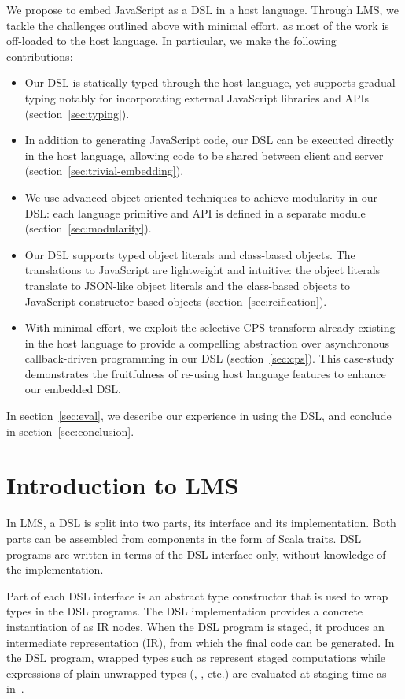 \documentclass[runningheads,a4paper]{llncs}
\begin{document}
We propose to embed JavaScript as a DSL in a host language. Through LMS, we tackle the challenges outlined above with minimal effort, as most of the work is off-loaded to the host language. In particular, we make the following contributions:
\begin{itemize}
\item Our DSL is statically typed through the host language, yet supports gradual typing notably for incorporating external JavaScript libraries and APIs (section~\ref{sec:typing}).
\item In addition to generating JavaScript code, our DSL can be executed directly in the host language, allowing code to be shared between client and server (section~\ref{sec:trivial-embedding}).
\item We use advanced object-oriented techniques to achieve modularity in our DSL: each language primitive and API is defined in a separate module (section~\ref{sec:modularity}).
\item Our DSL supports typed object literals and class-based objects. The translations to JavaScript are lightweight and intuitive: the object literals translate to JSON-like object literals and the class-based objects to JavaScript constructor-based objects (section~\ref{sec:reification}).
\item With minimal effort, we exploit the selective CPS transform already existing in the host language to provide a compelling abstraction over asynchronous callback-driven programming in our DSL (section~\ref{sec:cps}). This case-study demonstrates the fruitfulness of re-using host language features to enhance our embedded DSL.
\end{itemize}

In section~\ref{sec:eval}, we describe our experience in using the DSL, and conclude in section~\ref{sec:conclusion}.


\section{Introduction to LMS}

In LMS, a DSL is split into two parts, its
interface and its implementation. Both parts can be assembled from
components in the form of Scala traits. DSL programs are written in
terms of the DSL interface only, without knowledge of the
implementation.

Part of each DSL interface is an abstract type constructor
 that is used to wrap types in the DSL programs. The DSL
implementation provides a concrete instantiation of  as IR
nodes. When the DSL program is staged, it produces an intermediate
representation (IR), from which the final code can be generated. In
the DSL program, wrapped types such as  represent
staged computations while expressions of plain unwrapped types
(, , etc.) are evaluated at staging time as
in~\cite{finally-tagless,polymorphic-embedding}.
\end{document}
